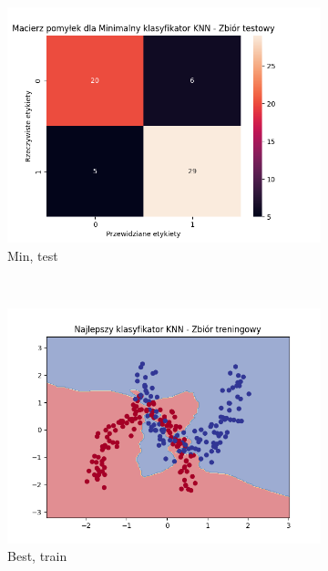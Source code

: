 \documentclass[12pt]{article}
\newcommand*{\subfigwidth}{0.24\textwidth}
\begin{document}
\begin{figure}[H]
\begin{subfigure}[t]{\subfigwidth}
        \includegraphics[width=\linewidth]{img/exp_2/knn/2_3/min/test_matrix.png}
        \caption{Min, test}
    \end{subfigure} 
    \\
    \begin{subfigure}[t]{\subfigwidth}
        \includegraphics[width=\linewidth]{img/exp_2/knn/2_3/best/train_boundary.png}
        \caption{Best, train}
    \end{subfigure}
    \hfill
    \begin{subfigure}[t]{\subfigwidth}

\end{subfigure}
\end{figure}
\end{document}
